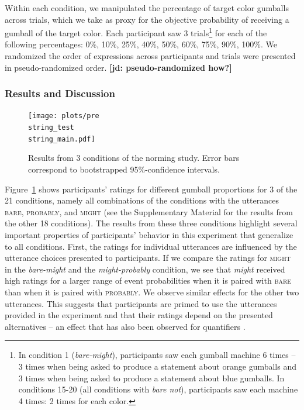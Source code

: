 \documentclass[lucida,biblatex]{sp} %
\newcommand{\jd}[1]{\textcolor{PinkyPurple}{\textbf{[jd: #1]}}}
\begin{document}
\noindent Within each condition, we manipulated the percentage of target color gumballs across trials, which we take as proxy for the objective probability of receiving a gumball of the target color. 
Each participant saw 3 trials\footnote{In condition 1 (\textit{bare-might}), participants saw each gumball machine 6 times -- 3 times when being asked to produce a statement about orange gumballs and 3 times when being asked to produce a statement about blue gumballs. In conditions 15-20 (all conditions with \textit{bare not}), participants saw each machine 4 times: 2 times for each color.} 
for each of the following percentages: 0\%, 10\%, 25\%, 40\%, 50\%, 60\%, 75\%, 90\%, 100\%. We randomized the order of expressions across participants and trials were presented in pseudo-randomized order. \jd{pseudo-randomized how?}


\subsubsection{Results and Discussion}

\begin{figure}
\texttt{[image: plots/pre\\string\_test\\string\_main.pdf]} 
\caption{Results from 3 conditions of the norming study. Error bars correspond to bootstrapped 95\%-confidence intervals. \label{fig:norming-results-main} }
\end{figure}

Figure~\ref{fig:norming-results-main} shows participants' ratings for different gumball proportions for 3 of the 21 conditions, namely all combinations of the conditions
with the utterances \textsc{bare}, \textsc{probably}, and \textsc{might} (see the Supplementary Material for the results from the other 18 conditions). 
The results from these three conditions highlight several important properties of participants'
behavior in this experiment that generalize to all conditions.
First, the ratings for individual utterances are influenced by the utterance choices presented to participants.
If we compare the ratings for \textsc{might} in the \textit{bare-might} and the \textit{might-probably} condition, we see that \textit{might} received high ratings for a larger
range of event probabilities when it is paired with \textsc{bare} than when it is paired with \textsc{probably}. We observe similar effects for the other two utterances.
This suggests that participants are primed to use the utterances provided in the experiment and that their ratings depend on the presented alternatives -- an effect that
has also been observed for quantifiers \citep{DegenTanenhaus2015}.
\end{document}

